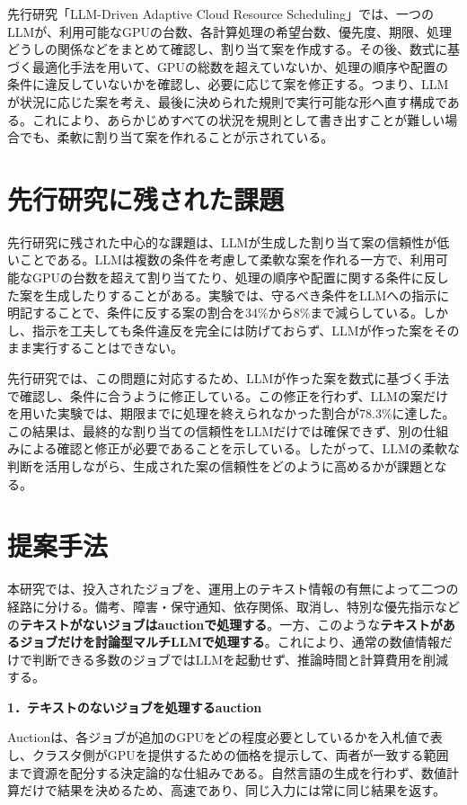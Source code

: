 \documentclass[10pt,a4paper]{article}
\begin{document}
先行研究「LLM-Driven Adaptive Cloud Resource Scheduling」では、一つのLLMが、利用可能なGPUの台数、各計算処理の希望台数、優先度、期限、処理どうしの関係などをまとめて確認し、割り当て案を作成する。その後、数式に基づく最適化手法を用いて、GPUの総数を超えていないか、処理の順序や配置の条件に違反していないかを確認し、必要に応じて案を修正する。つまり、LLMが状況に応じた案を考え、最後に決められた規則で実行可能な形へ直す構成である。これにより、あらかじめすべての状況を規則として書き出すことが難しい場合でも、柔軟に割り当て案を作れることが示されている。

\section{先行研究に残された課題}

先行研究に残された中心的な課題は、LLMが生成した割り当て案の信頼性が低いことである。LLMは複数の条件を考慮して柔軟な案を作れる一方で、利用可能なGPUの台数を超えて割り当てたり、処理の順序や配置に関する条件に反した案を生成したりすることがある。実験では、守るべき条件をLLMへの指示に明記することで、条件に反する案の割合を34\%から8\%まで減らしている。しかし、指示を工夫しても条件違反を完全には防げておらず、LLMが作った案をそのまま実行することはできない。

先行研究では、この問題に対応するため、LLMが作った案を数式に基づく手法で確認し、条件に合うように修正している。この修正を行わず、LLMの案だけを用いた実験では、期限までに処理を終えられなかった割合が78.3\%に達した。この結果は、最終的な割り当ての信頼性をLLMだけでは確保できず、別の仕組みによる確認と修正が必要であることを示している。したがって、LLMの柔軟な判断を活用しながら、生成された案の信頼性をどのように高めるかが課題となる。

\section{提案手法}

本研究では、投入されたジョブを、運用上のテキスト情報の有無によって二つの経路に分ける。備考、障害・保守通知、依存関係、取消し、特別な優先指示などの\textbf{テキストがないジョブはauctionで処理する}。一方、このような\textbf{テキストがあるジョブだけを討論型マルチLLMで処理する}。これにより、通常の数値情報だけで判断できる多数のジョブではLLMを起動せず、推論時間と計算費用を削減する。

\textbf{1．テキストのないジョブを処理するauction}

Auctionは、各ジョブが追加のGPUをどの程度必要としているかを入札値で表し、クラスタ側がGPUを提供するための価格を提示して、両者が一致する範囲まで資源を配分する決定論的な仕組みである。自然言語の生成を行わず、数値計算だけで結果を決めるため、高速であり、同じ入力には常に同じ結果を返す。
\end{document}
